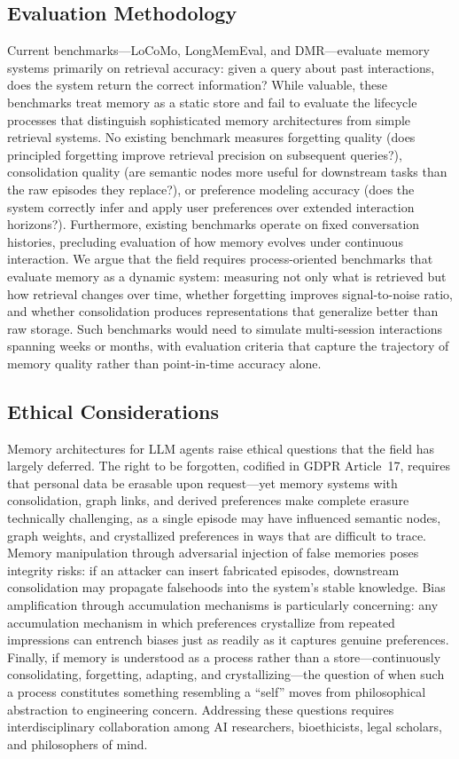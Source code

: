 \subsection{Evaluation Methodology}

Current benchmarks---LoCoMo, LongMemEval, and DMR---evaluate memory
systems primarily on retrieval accuracy: given a query about past
interactions, does the system return the correct information? While
valuable, these benchmarks treat memory as a static store and fail to
evaluate the lifecycle processes that distinguish sophisticated memory
architectures from simple retrieval systems. No existing benchmark
measures forgetting quality (does principled forgetting improve
retrieval precision on subsequent queries?), consolidation quality
(are semantic nodes more useful for downstream tasks than the raw
episodes they replace?), or preference modeling accuracy (does the
system correctly infer and apply user preferences over extended
interaction horizons?). Furthermore, existing benchmarks operate on
fixed conversation histories, precluding evaluation of how memory
evolves under continuous interaction. We argue that the field requires
process-oriented benchmarks that evaluate memory as a dynamic system:
measuring not only what is retrieved but how retrieval changes over
time, whether forgetting improves signal-to-noise ratio, and whether
consolidation produces representations that generalize better than
raw storage. Such benchmarks would need to simulate multi-session
interactions spanning weeks or months, with evaluation criteria that
capture the trajectory of memory quality rather than point-in-time
accuracy alone.

\subsection{Ethical Considerations}

Memory architectures for LLM agents raise ethical questions that the
field has largely deferred. The right to be forgotten, codified in
GDPR Article~17, requires that personal data be erasable upon
request---yet memory systems with consolidation, graph links, and
derived preferences make complete erasure technically challenging, as
a single episode may have influenced semantic nodes, graph weights,
and crystallized preferences in ways that are difficult to trace.
Memory manipulation through adversarial injection of false memories
poses integrity risks: if an attacker can insert fabricated episodes,
downstream consolidation may propagate falsehoods into the system's
stable knowledge. Bias amplification through accumulation mechanisms
is particularly concerning: any accumulation mechanism in which
preferences crystallize from repeated impressions can entrench
biases just as readily as it captures genuine preferences. Finally, if memory is
understood as a process rather than a store---continuously
consolidating, forgetting, adapting, and crystallizing---the question
of when such a process constitutes something resembling a ``self''
moves from philosophical abstraction to engineering concern.
Addressing these questions requires interdisciplinary collaboration
among AI researchers, bioethicists, legal scholars, and philosophers
of mind.
